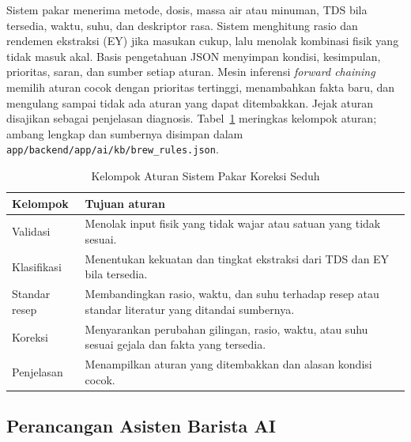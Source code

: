 Sistem pakar menerima metode, dosis, massa air atau minuman, TDS bila tersedia, waktu, suhu, dan deskriptor rasa. Sistem menghitung rasio dan rendemen ekstraksi (EY) jika masukan cukup, lalu menolak kombinasi fisik yang tidak masuk akal. Basis pengetahuan JSON menyimpan kondisi, kesimpulan, prioritas, saran, dan sumber setiap aturan. Mesin inferensi \textit{forward chaining} memilih aturan cocok dengan prioritas tertinggi, menambahkan fakta baru, dan mengulang sampai tidak ada aturan yang dapat ditembakkan. Jejak aturan disajikan sebagai penjelasan diagnosis. Tabel~\ref{tab:aturan-pakar} meringkas kelompok aturan; ambang lengkap dan sumbernya disimpan dalam \texttt{app/backend/app/ai/kb/brew\_rules.json}.

\begin{table}[htbp]
\centering
\caption{Kelompok Aturan Sistem Pakar Koreksi Seduh}
\label{tab:aturan-pakar}
\begin{tabular}{p{}p{}}
\toprule
Kelompok & Tujuan aturan \\
\midrule
Validasi & Menolak input fisik yang tidak wajar atau satuan yang tidak sesuai. \\
Klasifikasi & Menentukan kekuatan dan tingkat ekstraksi dari TDS dan EY bila tersedia. \\
Standar resep & Membandingkan rasio, waktu, dan suhu terhadap resep atau standar literatur yang ditandai sumbernya. \\
Koreksi & Menyarankan perubahan gilingan, rasio, waktu, atau suhu sesuai gejala dan fakta yang tersedia. \\
Penjelasan & Menampilkan aturan yang ditembakkan dan alasan kondisi cocok. \\
\bottomrule
\end{tabular}
\end{table}

\subsection{Perancangan Asisten Barista AI}
\label{subsec:perancangan-asisten}

